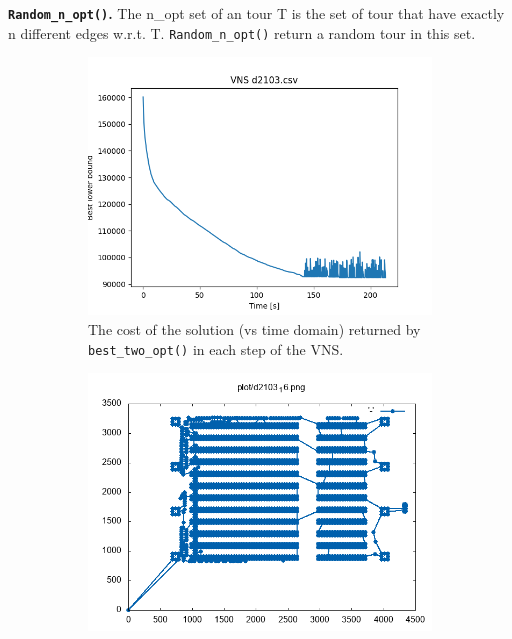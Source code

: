 \textbf{\texttt{Random\_n\_opt()}.} The n\_opt set of an tour T is the set of tour that have exactly n different edges w.r.t. T. \texttt{Random\_n\_opt()} return a random tour in this set.
\begin{figure}[!h]
	\begin{subfigure}{.5\columnwidth}
		\centering
		\includegraphics[width=\columnwidth]{../res/d2103.png}
		\caption{The cost of the solution (vs time domain) returned by \texttt{best\_two\_opt()} in each step of the VNS.}
		\label{fig:VNS_d2103}
	\end{subfigure}
	\begin{subfigure}{.5\columnwidth}
		\centering
		\includegraphics[width=\columnwidth]{../res/d2103_16.png}

\end{subfigure}
\end{figure}
